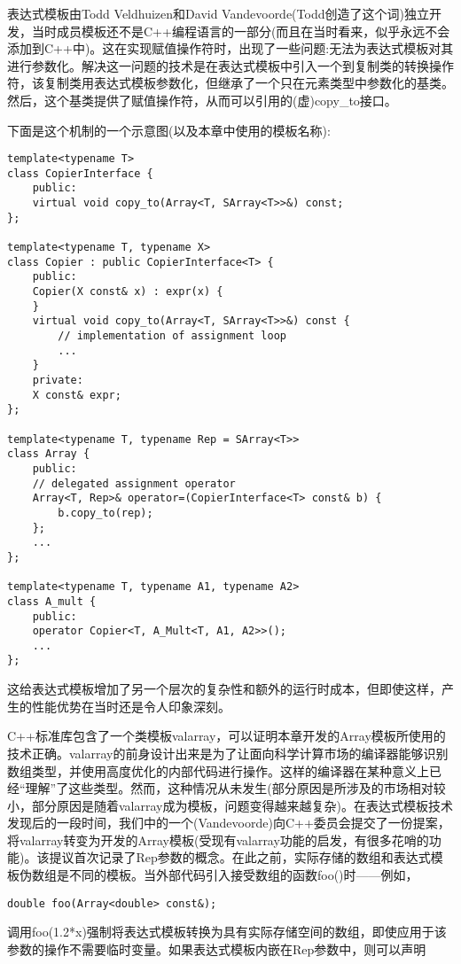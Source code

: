表达式模板由Todd Veldhuizen和David Vandevoorde(Todd创造了这个词)独立开发，当时成员模板还不是C++编程语言的一部分(而且在当时看来，似乎永远不会添加到C++中)。这在实现赋值操作符时，出现了一些问题:无法为表达式模板对其进行参数化。解决这一问题的技术是在表达式模板中引入一个到复制类的转换操作符，该复制类用表达式模板参数化，但继承了一个只在元素类型中参数化的基类。然后，这个基类提供了赋值操作符，从而可以引用的(虚)copy\_to接口。

下面是这个机制的一个示意图(以及本章中使用的模板名称):

\begin{lstlisting}[style=styleCXX]
template<typename T>
class CopierInterface {
	public:
	virtual void copy_to(Array<T, SArray<T>>&) const;
};

template<typename T, typename X>
class Copier : public CopierInterface<T> {
	public:
	Copier(X const& x) : expr(x) {
	}
	virtual void copy_to(Array<T, SArray<T>>&) const {
		// implementation of assignment loop
		...
	}
	private:
	X const& expr;
};

template<typename T, typename Rep = SArray<T>>
class Array {
	public:
	// delegated assignment operator
	Array<T, Rep>& operator=(CopierInterface<T> const& b) {
		b.copy_to(rep);
	};
	...
};

template<typename T, typename A1, typename A2>
class A_mult {
	public:
	operator Copier<T, A_Mult<T, A1, A2>>();
	...
};
\end{lstlisting}

这给表达式模板增加了另一个层次的复杂性和额外的运行时成本，但即使这样，产生的性能优势在当时还是令人印象深刻。

C++标准库包含了一个类模板valarray，可以证明本章开发的Array模板所使用的技术正确。valarray的前身设计出来是为了让面向科学计算市场的编译器能够识别数组类型，并使用高度优化的内部代码进行操作。这样的编译器在某种意义上已经“理解”了这些类型。然而，这种情况从未发生(部分原因是所涉及的市场相对较小，部分原因是随着valarray成为模板，问题变得越来越复杂)。在表达式模板技术发现后的一段时间，我们中的一个(Vandevoorde)向C++委员会提交了一份提案，将valarray转变为开发的Array模板(受现有valarray功能的启发，有很多花哨的功能)。该提议首次记录了Rep参数的概念。在此之前，实际存储的数组和表达式模板伪数组是不同的模板。当外部代码引入接受数组的函数foo()时——例如，

\begin{lstlisting}[style=styleCXX]
double foo(Array<double> const&);
\end{lstlisting}

调用foo(1.2*x)强制将表达式模板转换为具有实际存储空间的数组，即使应用于该参数的操作不需要临时变量。如果表达式模板内嵌在Rep参数中，则可以声明

